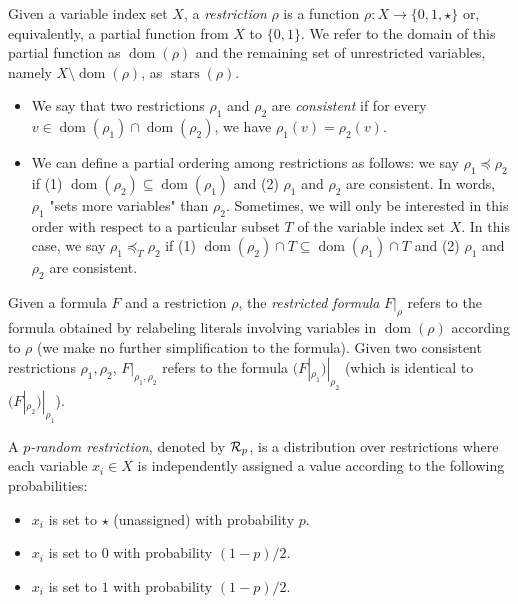 \begin{definition}[Restriction] %
\label{def:restriction}
Given a variable index set $X$, a \emph{restriction} $\rho$ is a function $\rho: X \to \{0, 1, \star\}$ or, equivalently, a partial function from $X$ to $\{0, 1\}$. We refer to the domain of this partial function as $\operatorname{dom}(\rho)$ and the remaining set of unrestricted variables, namely $X \setminus \operatorname{dom}(\rho)$, as $\operatorname{stars}(\rho)$.
\begin{itemize}
    \item We say that two restrictions $\rho_1$ and $\rho_2$ are \emph{consistent} if for every $v \in \operatorname{dom}(\rho_1) \cap \operatorname{dom}(\rho_2)$, we have $\rho_1(v) = \rho_2(v)$.
    \item We can define a partial ordering among restrictions as follows: we say $\rho_1 \preceq \rho_2$ if (1) $\operatorname{dom}(\rho_2) \subseteq \operatorname{dom}(\rho_1)$ and (2) $\rho_1$ and $\rho_2$ are consistent. In words, $\rho_1$ "sets more variables" than $\rho_2$. Sometimes, we will only be interested in this order with respect to a particular subset $T$ of the variable index set $X$. In this case, we say $\rho_1 \preceq_T \rho_2$ if (1) $\operatorname{dom}(\rho_2) \cap T \subseteq \operatorname{dom}(\rho_1) \cap T$ and (2) $\rho_1$ and $\rho_2$ are consistent.
\end{itemize}

Given a formula $F$ and a restriction $\rho$, the \emph{restricted formula} $F|_{\rho}$ refers to the formula obtained by relabeling literals involving variables in $\operatorname{dom}(\rho)$ according to $\rho$ (we make no further simplification to the formula). Given two consistent restrictions $\rho_1, \rho_2$, $F|_{\rho_1, \rho_2}$ refers to the formula $(F|_{\rho_1})|_{\rho_2}$ (which is identical to $(F|_{\rho_2})|_{\rho_1}$).
\end{definition}

\begin{definition}  %
\label{def:random-restriction}
A \emph{$p$-random restriction}, denoted by $\mathbf{\mathcal{R}}_p$, is a distribution over restrictions where each variable $x_i \in X$ is independently assigned a value according to the following probabilities:
\begin{itemize}
    \item $x_i$ is set to $\star$ (unassigned) with probability $p$.
    \item $x_i$ is set to $0$ with probability $(1-p)/2$.
    \item $x_i$ is set to $1$ with probability $(1-p)/2$.
\end{itemize}
\end{definition}

